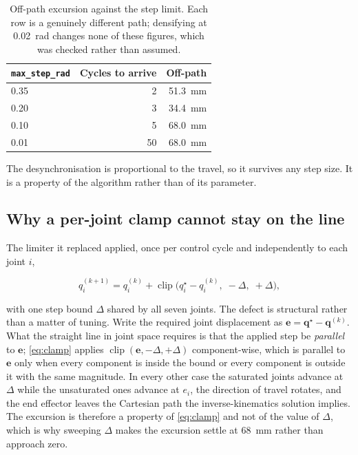 \begin{table}[htbp]
  \centering
  \caption[Step size sweep]{Off-path excursion against the step limit. Each
  row is a genuinely different path; densifying at \SI{0.02}{\radian} changes
  none of these figures, which was checked rather than assumed.}
  \label{tab:stepsweep}
  \begin{tabular}{@{}lrr@{}}
    \toprule
    \texttt{max\_step\_rad} & Cycles to arrive & Off-path \\
    \midrule
    0.35 & 2  & \SI{51.3}{\milli\metre} \\
    0.20 & 3  & \SI{34.4}{\milli\metre} \\
    0.10 & 5  & \SI{68.0}{\milli\metre} \\
    0.01 & 50 & \SI{68.0}{\milli\metre} \\
    \bottomrule
  \end{tabular}
\end{table}

The desynchronisation is proportional to the travel, so it survives any step
size. It is a property of the algorithm rather than of its parameter.

\subsection{Why a per-joint clamp cannot stay on the line}
\label{sec:clamp-maths}

The limiter it replaced applied, once per control cycle and independently to
each joint $i$,

\begin{equation}
  \label{eq:clamp}
  q_i^{(k+1)} = q_i^{(k)}
    + \operatorname{clip}\!\bigl(q_i^{\star} - q_i^{(k)},\;
                                 -\Delta,\; +\Delta\bigr),
\end{equation}

with one step bound $\Delta$ shared by all seven joints. The defect is
structural rather than a matter of tuning. Write the required joint
displacement as $\mathbf{e} = \mathbf{q}^{\star} - \mathbf{q}^{(k)}$. What the
straight line in joint space requires is that the applied step be
\emph{parallel} to $\mathbf{e}$; \cref{eq:clamp} applies
$\operatorname{clip}(\mathbf{e}, -\Delta, +\Delta)$ component-wise, which is
parallel to $\mathbf{e}$ only when every component is inside the bound or
every component is outside it with the same magnitude. In every other case the
saturated joints advance at $\Delta$ while the unsaturated ones advance at
$e_i$, the direction of travel rotates, and the end effector leaves the
Cartesian path the inverse-kinematics solution implies. The excursion is
therefore a property of \cref{eq:clamp} and not of the value of $\Delta$,
which is why sweeping $\Delta$ makes the excursion settle at
\SI{68}{\milli\metre} rather than approach zero.

